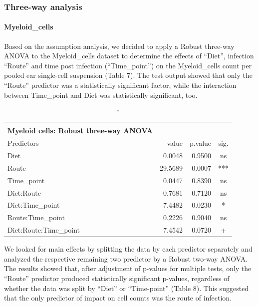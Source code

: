 \documentclass[
  12pt,
  letterpaper,
]{article}
\begin{document}
\subsubsection{Three-way analysis}\label{three-way-analysis}

\paragraph{Myeloid\_cells}\label{myeloid_cells-1}

Based on the assumption analysis, we decided to apply a Robust three-way ANOVA to the Myeloid\_cells dataset to determine the effects of ``Diet'', infection ``Route'' and time post infection (``Time\_point'') on the Myeloid\_cells count per pooled ear single-cell suspension (Table 7). The test output showed that only the ``Route'' predictor was a statistically significant factor, while the interaction between Time\_point and Diet was statistically significant, too.

\begin{longtable}{l|rrc}
\caption*{
{\large \textbf{Appendix Table 7}} \\ 
{\small \textbf{Myeloid cells: Robust three-way ANOVA}}
} \\ 
\toprule
\multicolumn{1}{l}{Predictors} & value & p.value & sig. \\ 
\midrule\addlinespace[2.5pt]
Diet & 0.0048 & 0.9500 & ns \\ 
Route & 29.5689 & 0.0007 & *** \\ 
Time\_point & 0.0447 & 0.8390 & ns \\ 
Diet:Route & 0.7681 & 0.7120 & ns \\ 
Diet:Time\_point & 7.4482 & 0.0230 & * \\ 
Route:Time\_point & 0.2226 & 0.9040 & ns \\ 
Diet:Route:Time\_point & 7.4542 & 0.0720 & + \\ 
\bottomrule
\end{longtable}

We looked for main effects by splitting the data by each predictor separately and analyzed the respective remaining two predictor by a Robust two-way ANOVA. The results showed that, after adjustment of p-values for multiple tests, only the ``Route'' predictor produced statistically significant p-values, regardless of whether the data was split by ``Diet'' or ``Time-point'' (Table 8). This suggested that the only predictor of impact on cell counts was the route of infection.
\end{document}
